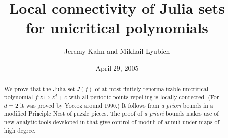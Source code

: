 
\baselineskip=24pt 
%

 






\bigskip\bigskip

\title[Higher degree polynomials]{Local connectivity of Julia sets\\ for unicritical polynomials}
\author {Jeremy Kahn and Mikhail Lyubich}
\date{April 29, 2005}

\thispagestyle{empty} 


\begin{abstract} 
  We prove that the Julia set $J(f)$ of 
at most finitely renormalizable unicritical polynomial  $f:z\mapsto  z^d+c$  with all periodic points repelling 
is locally connected. (For $d=2$ it was proved by Yoccoz around 1990.)
It follows from {\it a priori} bounds in a modified Principle Nest of puzzle pieces. 
The proof of {\it a priori} bounds  makes use of new analytic tools developed in \cite{covering lemma}
that give control of moduli of annuli under maps of high degree. 
\end{abstract}

\setcounter{tocdepth}{1}
 
\maketitle









%
%











